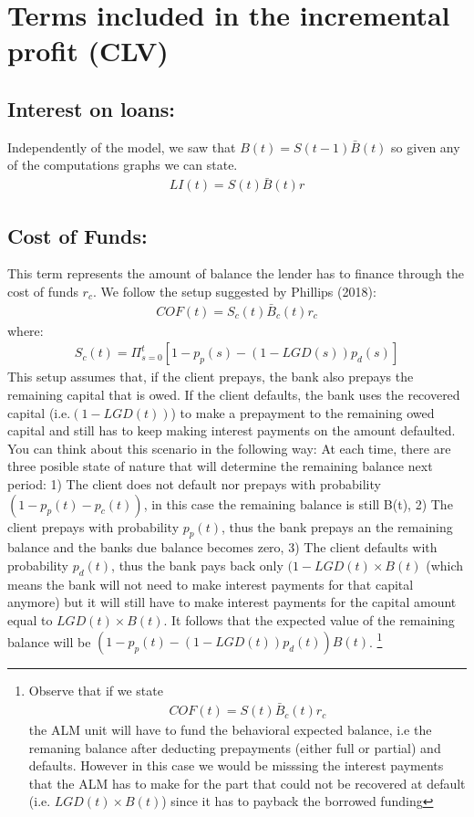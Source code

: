\section{ Terms included in the incremental profit (CLV)}
\subsection{ Interest on loans: }
Independently of the model, we saw that $B(t) = S(t-1)\bar{B}(t)$ so given any of the computations graphs we can state.
\begin{align}
LI(t) = S(t)\bar{ B}(t)r \label{eq:li}
\end{align}


\subsection{  Cost of Funds: }
This term represents the amount of balance the lender has to finance through the cost of funds $r_c$. We follow the setup suggested by Phillips (2018):
\begin{align}
COF(t) = S_c(t)\bar{ B}_c(t)r_c
\end{align}
where: 
\begin{align}
S_c(t)= \Pi_{s=0}^t [1- p_p(s)-(1-LGD(s))p_d(s) ]
\end{align}
This setup assumes that, if the client prepays, the bank also prepays the remaining capital that is owed. If the client defaults, the bank uses the recovered capital (i.e.$(1-LGD(t))$) to make a prepayment to the remaining owed capital and still has to keep making interest payments on the amount defaulted. \\

You can think about this scenario in the following way: At each time, there are three posible state of nature that will determine the remaining balance next period: 1) The client does not default nor prepays with probability $(1-p_p(t)-p_c(t))$, in this case the remaining balance is still B(t), 2) The client prepays with probability $p_p(t)$, thus the bank prepays an the remaining balance and the banks due balance becomes zero, 3) The client defaults with probability $p_d(t)$, thus the bank pays back only $(1-LGD(t) \times  B(t)$ (which means the bank will not need to make interest payments for that capital anymore) but it will still have to make interest payments for the capital amount equal to $LGD(t) \times B(t)$. It follows that the expected value of the remaining balance will be $(1-p_p(t)-(1-LGD(t))p_d(t))B(t)$.
\footnote{ 
Observe that if we state
\begin{align}
    COF(t) = S(t)\bar{B}_c(t)r_c
\end{align}
the ALM unit will have to fund the behavioral expected balance, i.e the remaning balance after deducting prepayments (either full or partial) and defaults. However in this case we would be misssing the interest payments that the ALM has to make for the part that could not be recovered at default (i.e. $LGD(t) \times B(t)$) since it has to payback the borrowed funding  

}
